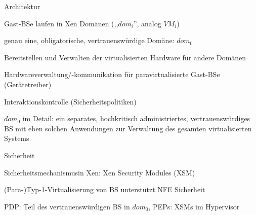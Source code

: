 \documentclass[a4paper]{article}
\begin{document}
\begin{multicols}{3}
    Architektur
    \begin{itemize*}
        \item Gast-BSe laufen in Xen Domänen (,,$dom_i$'', analog $VM_i$)
        \item genau eine, obligatorische, vertrauenswürdige Domäne: $dom_0$
        \begin{itemize*}
            \item Bereitstellen und Verwalten der virtualisierten Hardware für andere Domänen %
            \item Hardwareverwaltung/-kommunikation für paravirtualisierte Gast-BSe (Gerätetreiber)
            \item Interaktionskontrolle (Sicherheitspolitiken)
        \end{itemize*}
        \item $dom_0$ im Detail: ein separates, hochkritisch administriertes, vertrauenswürdiges BS mit eben solchen Anwendungen zur Verwaltung des gesamten virtualisierten Systems
    \end{itemize*}

    Sicherheit
    \begin{itemize*}
        \item Sicherheitsmechanismusin Xen: Xen Security Modules (XSM)
        \item (Para-)Typ-1-Virtualisierung von BS unterstützt NFE Sicherheit
        \item PDP: Teil des vertrauenswürdigen BS in $dom_0$, PEPs: XSMs im Hypervisor
    \end{itemize*}


\end{multicols}
\end{document}
